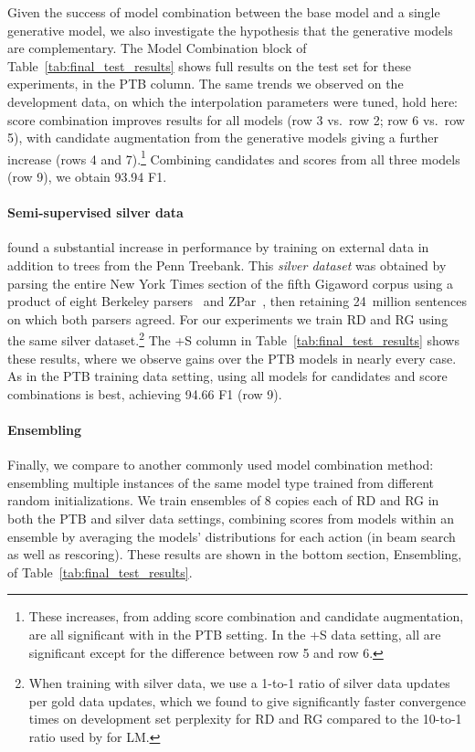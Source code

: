 \documentclass[11pt,a4paper]{article}
\begin{document}
Given the success of model combination between the base model and a single generative model, we also investigate the hypothesis that the generative models are complementary. The Model Combination block of Table~\ref{tab:final_test_results} shows full results on the test set for these experiments, in the PTB column. The same trends we observed on the development data, on which the interpolation parameters were tuned, hold here: score combination improves results for all models (row 3 vs.\ row 2; row 6 vs.\ row 5), with candidate augmentation from the generative models giving a further increase (rows 4 and 7).\footnote{These increases, from adding score combination and candidate augmentation, are all significant with  in the PTB setting. In the +S data setting, all are significant except for the difference between row 5 and row 6.} Combining candidates and scores from all three models (row 9), we obtain 93.94 F1.

\paragraph{Semi-supervised silver data}
\mbox{}\citet{Choe16Parsing} found a substantial increase in performance by training on external data in addition to trees from the Penn Treebank. This \emph{silver dataset} was obtained by parsing the entire New York Times section of the fifth Gigaword corpus using a product of eight Berkeley parsers~\citep{Petrov10Products} and ZPar~\citep{Zhu13Fast}, then retaining 24~million sentences on which both parsers agreed.
For our experiments we train RD and RG using the same silver dataset.\footnote{When training with silver data, we use a 1-to-1 ratio of silver data updates per gold data updates, which we found to give significantly faster convergence times on development set perplexity for RD and RG compared to the 10-to-1 ratio used by \citet{Choe16Parsing} for LM. 
}
The +S column in Table~\ref{tab:final_test_results} shows these results, where we observe gains over the PTB models in nearly every case. As in the PTB training data setting, using all models for candidates and score combinations is best, achieving 94.66 F1 (row 9).

\paragraph{Ensembling}
Finally, we compare to another commonly used model combination method: ensembling multiple instances of the same model type trained from different random initializations. We train ensembles of 8 copies each of RD and RG in both the PTB and silver data settings, combining scores from models within an ensemble by averaging the models' distributions for each action (in beam search as well as rescoring). These results are shown in the bottom section, Ensembling, of Table~\ref{tab:final_test_results}. 
\end{document}
